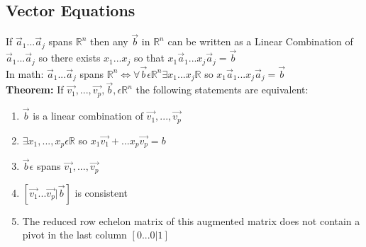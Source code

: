 \documentclass{article}
\begin{document}
\subsection{Vector Equations}
If ${\vec{a}_1...\vec{a}_j}$ spans $\mathbb{R}^n$ then any $\vec{b}$ in $\mathbb{R}^n$ can be written as a Linear Combination of ${\vec{a}_1...\vec{a}_j}$ so there exists ${{x}_1...{x}_j}$ so that ${x_1\vec{a}_1...x_j\vec{a}_j}=\vec{b}$ 
\\In math: ${\vec{a}_1...\vec{a}_j}$ spans $\mathbb{R}^n \Leftrightarrow \forall \vec{b} \epsilon \mathbb{R}^n \exists {{x}_1...{x}_j} \mathbb{R}$ so ${x_1\vec{a}_1...x_j\vec{a}_j}=\vec{b}$  
\\ \textbf{Theorem: }
If $\vec{v_1},..., \vec{v_p}, \vec{b}, \epsilon \mathbb{R}^n$ the following statements are equivalent:
\begin{enumerate}
    \item $\vec{b}$ is a linear combination of $\vec{v_1},...,\vec{v_p}$
    \item $\exists x_1,...,x_p \epsilon \mathbb{R}$ so $x_1\vec{v_1}+...x_p\vec{v_p}=b$
    \item $\vec{b} \epsilon$ spans {$\vec{v_1},..., \vec{v_p}$}
    \item {} $\left[\vec{v_1}...\vec{v_p} | \vec{b}\right]$ is consistent
    \item The reduced row echelon matrix of this augmented matrix does not contain a pivot in the last column $\left[0...0| 1 \right]$
\end{enumerate}
\end{document}

